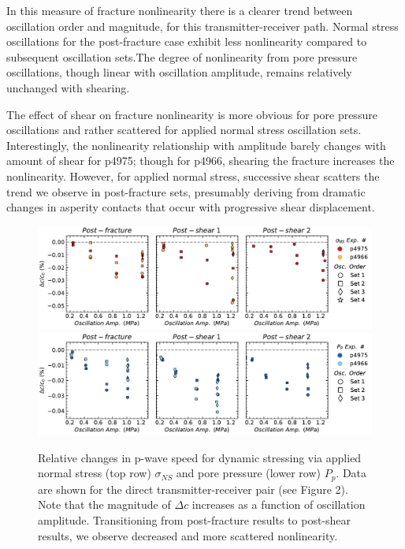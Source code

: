 \documentclass[letterpaper,10pt]{article}
\begin{document}
In this measure of fracture nonlinearity there is a clearer trend between oscillation order and magnitude, for this transmitter-receiver path. Normal stress oscillations for the post-fracture case exhibit less nonlinearity compared to  subsequent oscillation sets.The degree of nonlinearity from pore pressure oscillations, though linear with oscillation amplitude, remains relatively unchanged with shearing. 

The effect of shear on fracture nonlinearity is more obvious for pore pressure oscillations and rather scattered for applied normal stress oscillation sets. Interestingly, the nonlinearity relationship with amplitude barely changes with amount of shear for p4975; though for p4966,  shearing the fracture increases the nonlinearity. However, for applied normal stress, successive shear scatters the trend we observe in post-fracture sets, presumably deriving from dramatic changes in asperity contacts that occur with progressive shear displacement.

\clearpage

\begin{figure}[ht]
	\centering
	\includegraphics[width=1\columnwidth]{delc_amp_NS}
	\includegraphics[width=1\columnwidth]{delc_amp_PP}
	\caption{ Relative changes in p-wave speed for dynamic stressing via applied normal stress (top row)  $ \sigma_{NS} $ and pore pressure (lower row) $ P_p $. Data are shown for the direct transmitter-receiver pair (see Figure 2). Note that the magnitude of $ \Delta c $  increases as a function of oscillation amplitude. Transitioning from post-fracture results to post-shear results, we observe decreased and more scattered nonlinearity.}%
	\label{fig:delc_ns_amp}
\end{figure}
\end{document}
